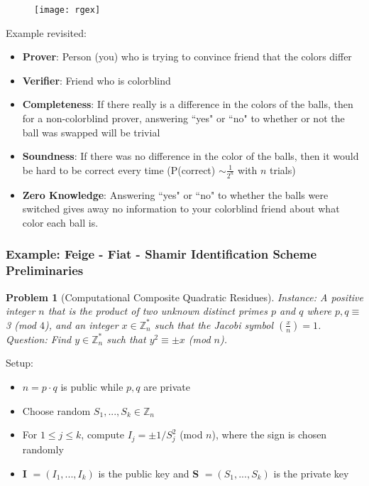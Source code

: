 \documentclass{beamer}
\newtheorem{prob}{Problem}
\begin{document}
\begin{frame}
\begin{small}
\begin{figure}
\texttt{[image: rgex]}
\centering
\end{figure}
Example revisited:
\begin{itemize}
\item \textbf{Prover}: Person (you) who is trying to convince friend that the colors differ
\item \textbf{Verifier}: Friend who is colorblind
\item \textbf{Completeness}: If there really is a difference in the colors of the balls, then for a non-colorblind prover, answering ``yes" or ``no" to whether or not the ball was swapped will be trivial 
\item \textbf{Soundness}: If there was no difference in the color of the balls, then it would be hard to be correct every time (P(correct) $\sim \frac{1}{2^n}$ with $n$ trials)
\item \textbf{Zero Knowledge}: Answering ``yes" or ``no" to whether the balls were switched gives away no information to your colorblind friend about what color each ball is.
\end{itemize}


\end{small}
\end{frame}

\begin{frame}
\begin{small}

\frametitle{Example: Feige - Fiat - Shamir Identification Scheme\\ Preliminaries}
 

\begin{prob}[Computational Composite Quadratic Residues]
Instance: A positive integer $n$ that is the product of two unknown distinct primes $p$ and $q$ where $p,q \equiv$ 3 (mod $4$), and an integer $x\in\mathbb{Z}_n^*$ such that the Jacobi symbol $\left(\frac{x}{n}\right) = 1$.
\vspace{3mm}
\\Question: Find $y\in\mathbb{Z}_n^*$ such that $y^2\equiv \pm x$ (mod $n$).
\end{prob}
\vspace{2mm}
Setup: 
\begin{itemize}
\item $n = p\cdot q$ is public while $p,q$ are private
\item Choose random $S_1, ..., S_k\in\mathbb{Z}_n$
\item For $1\leq j\leq k$, compute $I_j = \pm1/S_j^2$ (mod $n$), where the sign is chosen randomly
\item \textbf{I} $= (I_1, ..., I_k)$ is the public key and \textbf{S} $= (S_1, ..., S_k)$ is the private key
\end{itemize}



\end{small}
\end{frame}
\end{document}
